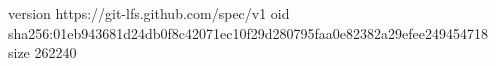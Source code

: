 version https://git-lfs.github.com/spec/v1
oid sha256:01eb943681d24db0f8c42071ec10f29d280795faa0e82382a29efee249454718
size 262240
